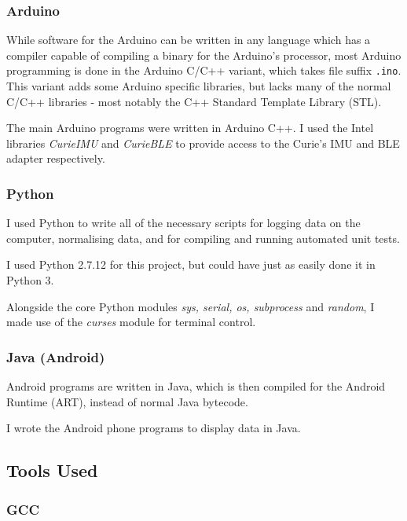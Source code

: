 \documentclass[a4paper]{article}
\begin{document}
\subsubsection{Arduino}

While software for the Arduino can be written in any language which has a compiler capable of compiling a binary for the Arduino's processor, most Arduino programming is done in the Arduino C/C++ variant\cite{ppref7}, which takes file suffix \lstinline{.ino}. This variant adds some Arduino specific libraries\cite{ppref8}, but lacks many of the normal C/C++ libraries - most notably the C++ Standard Template Library (STL).\cite{ppref9}

The main Arduino programs were written in Arduino C++. I used the Intel libraries \textit{CurieIMU}\cite{ppref10} and \textit{CurieBLE}\cite{ppref11} to provide access to the Curie's IMU and BLE adapter respectively.

\subsubsection{Python}

I used Python\cite{ppref12} to write all of the necessary scripts for logging data on the computer, normalising data, and for compiling and running automated unit tests.

I used Python 2.7.12 for this project, but could have just as easily done it in Python 3.

Alongside the core Python modules \textit{sys, serial, os, subprocess} and \textit{random}, I made use of the \textit{curses}\cite{ppref13} module for terminal control.

\subsubsection{Java (Android)}

Android\cite{ppref14} programs are written in Java, which is then compiled for the Android Runtime (ART)\cite{ppref15}, instead of normal Java bytecode.

I wrote the Android phone programs to display data in Java.

\subsection{Tools Used}%
\label{subsec:pp_ts}

\subsubsection{GCC}
\end{document}
